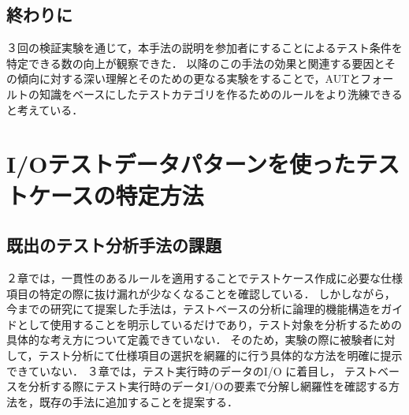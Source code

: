 \documentclass[a4paper,12pt]{jreport}
\begin{document}
%

\section{終わりに}
３回の検証実験を通じて，本手法の説明を参加者にすることによるテスト条件を特定できる数の向上が観察できた．
以降のこの手法の効果と関連する要因とその傾向に対する深い理解とそのための更なる実験をすることで，AUTとフォールトの知識をベースにしたテストカテゴリを作るためのルールをより洗練できると考えている．

\chapter{I/Oテストデータパターンを使ったテストケースの特定方法}
\section{既出のテスト分析手法の課題}
２章では，一貫性のあるルールを適用することでテストケース作成に必要な仕様項目の特定の際に抜け漏れが少なくなることを確認している．
しかしながら，今までの研究にて提案した手法は，テストベースの分析に論理的機能構造をガイドとして使用することを明示しているだけであり，テスト対象を分析するための具体的な考え方について定義できていない．
そのため，実験の際に被験者に対して，テスト分析にて仕様項目の選択を網羅的に行う具体的な方法を明確に提示できていない．
３章では，テスト実行時のデータのI/O に着目し，
テストベースを分析する際にテスト実行時のデータI/Oの要素で分解し網羅性を確認する方法を，既存の手法に追加することを提案する．
\end{document}

